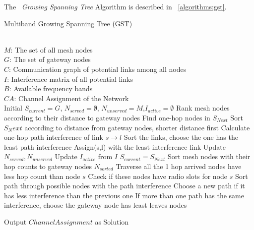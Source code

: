 The ~\emph{Growing Spanning Tree} Algorithm is described in ~\ref{algorithms:gst}.







\begin{algorithm}
    \small
\caption{Multiband Growing Spanning Tree (GST)}
\label{algorithms:gst}
\begin{algorithmic}[1]
\REQUIRE  ~~\\
	 $M$: The set of all mesh nodes\\
	 $G$: The set of gateway nodes\\
	 $C$: Communication graph of potential links among all nodes\\
	 $I$: Interference matrix of all potential links \\
	 $B$: Available frequency bands
\ENSURE ~~\\    
$CA$: Channel Assignment of the Network\\
\STATE Initial $S_{current}=G$, $N_{served}=\emptyset$, $N_{unserved}=M$,$I_{active}=\emptyset$
\STATE Rank mesh nodes according to their distance to gateway nodes
	\STATE Find one-hop nodes in $S_{Next}$
	\STATE Sort $S_Next$ according to distance from gateway nodes, shorter distance first
		\STATE Calculate one-hop path interference of link $s\rightarrow l$
		\STATE Sort the links, choose the one has the least path interference
		\STATE Assign(s,l) with the least interference link
		\STATE Update $N_{served},N_{unserved}$
		\STATE Update $I_{active}$ from $I$
	\ENDFOR
	\STATE $S_{current}=S_{Next}$
\ENDFOR
\ENDWHILE
\STATE Sort mesh nodes with their hop counts to gateway nodes $N_{sorted}$
	\STATE Traverse all the 1 hop arrived nodes have less hop count than node $s$ 
	\STATE Check if these nodes have radio slots for node $s$
	\STATE Sort path through possible nodes with the path interference
	\STATE Choose a new path if it has less interference than the previous one
	\STATE If more than one path has the same interference, choose the gateway node has least leaves nodes 
\ENDFOR
\ENDWHILE

Output $Channel Assignment$ as Solution
\end{algorithmic}
\end{algorithm}
      


